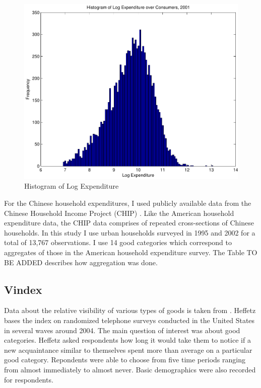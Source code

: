 \documentclass{article}
\begin{document}
\begin{figure}
	\begin{center}
		\includegraphics[scale=.8]{pics/exphist_cropped.pdf}
	\end{center}
	\label{fig:exphist}
	\caption{Histogram of  Log Expenditure}
\end{figure}

For the Chinese household expenditures, I used publicly available data from the Chinese Household Income Project (CHIP) \citep{CHIP2002}. Like the American household expenditure data, the CHIP data comprises of repeated cross-sections of Chinese households.  In this study I use urban households surveyed in 1995 and 2002 for a total of 13,767 observations.  I use 14 good categories which correspond to aggregates of those in the American household expenditure survey.   The Table TO BE ADDED describes how aggregation was done.  
\subsection{Vindex}
Data about the relative visibility of  various types of goods is taken from \citet{Heffetz2011}.  
Heffetz bases the index on randomized telephone surveys conducted in the United States in several waves around 2004.
The main question of interest was about good categories.
Heffetz asked respondents how long it would take them to notice if a new acquaintance similar to themselves spent more than average on a particular good category.
Repondents were able to choose from five time periods ranging from almost immediately to almost never.  
Basic demographics were also recorded for respondents.  
\end{document}
